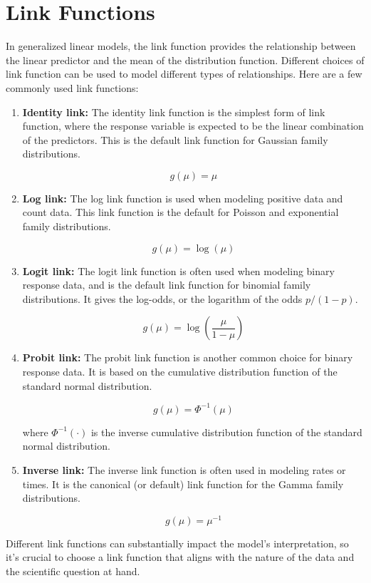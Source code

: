 \chapter{Link Functions}


In generalized linear models, the link function provides the relationship between the linear predictor and the mean of the distribution function. Different choices of link function can be used to model different types of relationships. Here are a few commonly used link functions:

\begin{enumerate}

\item \textbf{Identity link:} The identity link function is the simplest form of link function, where the response variable is expected to be the linear combination of the predictors. This is the default link function for Gaussian family distributions.

\[
g(\mu) = \mu
\]

\item \textbf{Log link:} The log link function is used when modeling positive data and count data. This link function is the default for Poisson and exponential family distributions. 

\[
g(\mu) = \log(\mu)
\]

\item \textbf{Logit link:} The logit link function is often used when modeling binary response data, and is the default link function for binomial family distributions. It gives the log-odds, or the logarithm of the odds $p/(1-p)$.

\[
g(\mu) = \log\left(\frac{\mu}{1-\mu}\right)
\]

\item \textbf{Probit link:} The probit link function is another common choice for binary response data. It is based on the cumulative distribution function of the standard normal distribution.

\[
g(\mu) = \Phi^{-1}(\mu)
\]

where $\Phi^{-1}(\cdot)$ is the inverse cumulative distribution function of the standard normal distribution.

\item \textbf{Inverse link:} The inverse link function is often used in modeling rates or times. It is the canonical (or default) link function for the Gamma family distributions.

\[
g(\mu) = \mu^{-1}
\]

\end{enumerate}

Different link functions can substantially impact the model's interpretation, so it's crucial to choose a link function that aligns with the nature of the data and the scientific question at hand.
